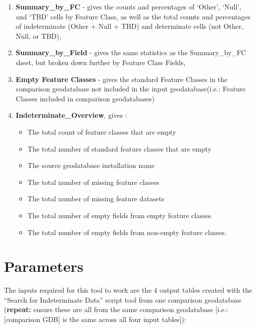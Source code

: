 \documentclass[openany]{book}
\providecommand{\tightlist}{%
  \setlength{\itemsep}{0pt}\setlength{\parskip}{0pt}}
\theoremstyle{definition}
\theoremstyle{definition}
\theoremstyle{definition}
\theoremstyle{remark}
\begin{document}
\begin{enumerate}
\def\labelenumi{\arabic{enumi}.}
\tightlist
\item
  \textbf{Summary\_by\_FC} - gives the counts and percentages of
  `Other', `Null', and `TBD' cells by Feature Class, as well as the
  total counts and percentages of indeterminate (Other + Null + TBD) and
  determinate cells (not Other, Null, or TBD),
\item
  \textbf{Summary\_by\_Field} - gives the same statistics as the
  Summary\_by\_FC sheet, but broken down further by Feature Class
  Fields,
\item
  \textbf{Empty Feature Classes} - gives the standard Feature Classes in
  the comparison geodatabase not included in the input geodatabase(i.e.:
  Feature Classes included in comparison geodatabases)
\item
  \textbf{Indeterminate\_Overview}, gives :

  \begin{itemize}
  \tightlist
  \item
    The total count of feature classes that are empty
  \item
    The total number of standard feature classes that are empty
  \item
    The source geodatabase installation name
  \item
    The total number of missing feature classes
  \item
    The total number of missing feature datasets
  \item
    The total number of empty fields from empty feature classes
  \item
    The total number of empty fields from non-empty feature classes.
  \end{itemize}
\end{enumerate}

\section{Parameters}\label{parameters-10}

The inputs required for this tool to work are the 4 output tables
created with the ``Search for Indeterminate Data'' script tool from one
comparison geodatabase (\textbf{repeat:} ensure these are all from the
same comparison geodatabase {[}i.e.: {[}comparison GDB{]} is the same
across all four input tables{]}):
\end{document}
